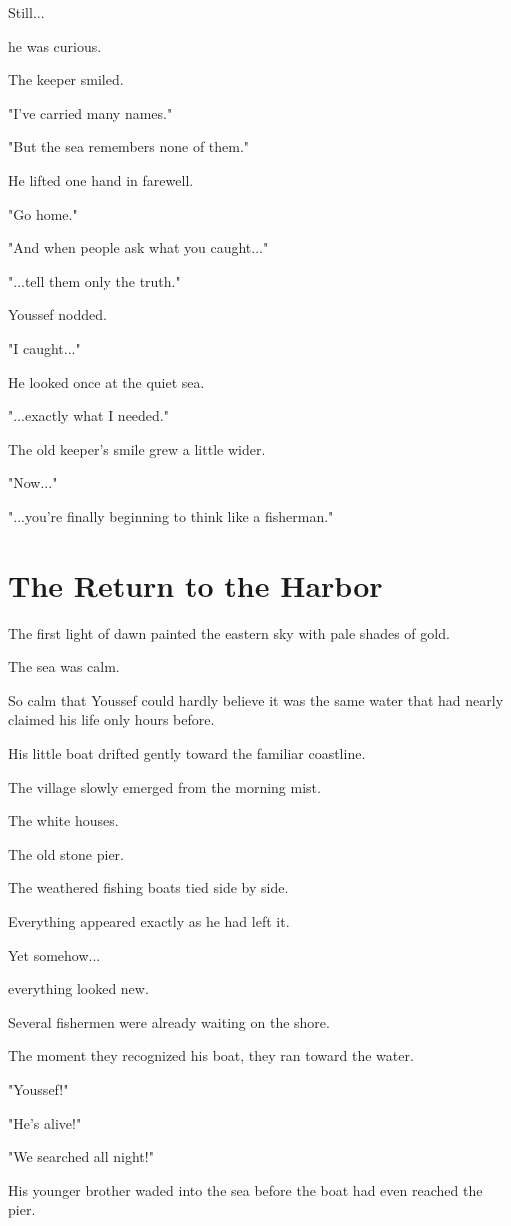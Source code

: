 \documentclass[12pt,openany]{book}
\begin{document}
Still...

he was curious.

The keeper smiled.

"I've carried many names."

"But the sea remembers none of them."

He lifted one hand in farewell.

"Go home."

"And when people ask what you caught..."

"...tell them only the truth."

Youssef nodded.

"I caught..."

He looked once at the quiet sea.

"...exactly what I needed."

The old keeper's smile grew a little wider.

"Now..."

"...you're finally beginning to think like a fisherman."
\section*{The Return to the Harbor}

The first light of dawn painted the eastern sky with pale shades of gold.

The sea was calm.

So calm that Youssef could hardly believe it was the same water that had nearly claimed his life only hours before.

His little boat drifted gently toward the familiar coastline.

The village slowly emerged from the morning mist.

The white houses.

The old stone pier.

The weathered fishing boats tied side by side.

Everything appeared exactly as he had left it.

Yet somehow...

everything looked new.

Several fishermen were already waiting on the shore.

The moment they recognized his boat, they ran toward the water.

"Youssef!"

"He's alive!"

"We searched all night!"

His younger brother waded into the sea before the boat had even reached the pier.
\end{document}
